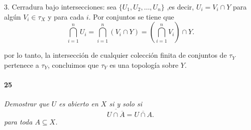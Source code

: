 \documentclass[12pt]{article}
\begin{document}
3. Cerradura bajo intersecciones: sea \( \{ U_1, U_2, \dots, U_n \} \) ,es decir, \( U_i = V_i \cap Y \) para algún \( V_i \in \tau_X \) y para cada \( i \). 
Por conjuntos se tiene que
\[
\bigcap_{i=1}^n U_i = \bigcap_{i=1}^n (V_i \cap Y) = \left( \bigcap_{i=1}^n V_i \right) \cap Y.
\]

por lo tanto, la intersección de cualquier colecci\'on finita de conjuntos de \( \tau_Y \) pertenece a \( \tau_Y \), 
concluimos que \( \tau_Y \) es una topolog\'ia sobre \( Y \).

\paragraph{25}
\textit{Demostrar que \( U \) es abierto en \( X \) si y solo si\[
\overline{U \cap \overline{A}} = \overline{U \cap A}.
\] para toda \( A \subseteq X \).}
\end{document}
